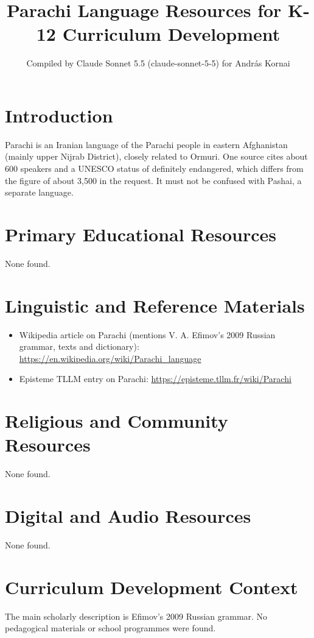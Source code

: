 \documentclass[12pt]{article}
\title{Parachi Language Resources for K-12 Curriculum Development}
\author{Compiled by Claude Sonnet 5.5 (claude-sonnet-5-5) for Andr\'as Kornai}
\date{}
\begin{document}
\maketitle
\section{Introduction}
Parachi is an Iranian language of the Parachi people in eastern Afghanistan (mainly upper Nijrab District), closely related to Ormuri. One source cites about 600 speakers and a UNESCO status of definitely endangered, which differs from the figure of about 3,500 in the request. It must not be confused with Pashai, a separate language.
\section{Primary Educational Resources}
None found.
\section{Linguistic and Reference Materials}
\begin{itemize}
\item Wikipedia article on Parachi (mentions V. A. Efimov's 2009 Russian grammar, texts and dictionary): \url{https://en.wikipedia.org/wiki/Parachi_language}
\item Episteme TLLM entry on Parachi: \url{https://episteme.tllm.fr/wiki/Parachi}
\end{itemize}
\section{Religious and Community Resources}
None found.
\section{Digital and Audio Resources}
None found.
\section{Curriculum Development Context}
The main scholarly description is Efimov's 2009 Russian grammar. No pedagogical materials or school programmes were found.
\end{document}
